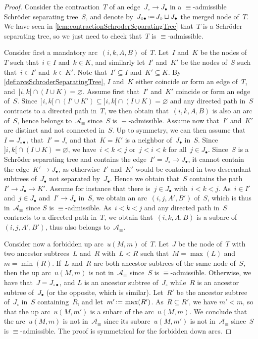 \documentclass{amsart}
\theoremstyle{definition}
\newcommand{\eqdef}{\mbox{\,\raisebox{0.2ex}{\scriptsize\ensuremath{\mathrm:}}\ensuremath{=}\,}} %
\newcommand{\arcs}{{\mathcal{A}}} %
\begin{document}
\begin{proof}
Consider the contraction~$T$ of an edge~$J_\circ \to J_\bullet$ in a $\equiv$-admissible Schröder separating tree~$S$, and denote by~$J_{\circ\bullet} \eqdef J_\circ \sqcup J_\bullet$ the merged node of~$T$.
We have seen in \cref{lem:contractionSchroderSeparatingTree} that~$T$ is a Schröder separating tree, so we just need to check that~$T$ is $\equiv$-admissible.

Consider first a mandatory arc~$(i,k,A,B)$ of~$T$.
Let~$I$ and~$K$ be the nodes of~$T$ such that~$i \in I$ and~$k \in K$, and similarly let~$I'$ and~$K'$ be the nodes of~$S$ such that~$i \in I'$ and~$k \in K'$.
Note that~$I' \subseteq I$ and~$K' \subseteq K$.
By \cref{def:arcsSchroderSeparatingTree}, $I$ and~$K$ either coincide or form an edge of~$T$, and~${{]i,k[} \cap (I \cup K) = \varnothing}$.
Assume first that~$I'$ and~$K'$ coincide or form an edge of~$S$.
Since~${{]i,k[} \cap (I' \cup K') \subseteq {]i,k[} \cap (I \cup K) = \varnothing}$ and any directed path in~$S$ contracts to a directed path in~$T$, we then obtain that~$(i,k,A,B)$ is also an arc of~$S$, hence belongs to~$\arcs_\equiv$ since~$S$ is $\equiv$-admissible.
Assume now that~$I'$ and~$K'$ are distinct and not connected in~$S$.
Up to symmetry, we can then assume that~$I = J_{\circ\bullet}$, that~$I' = J_\circ$ and that~$K = K'$ is a neighbor of~$J_\bullet$ in~$S$.
Since~${]i,k[} \cap (I \cup K) = \varnothing$, we have~$i < k < j$ or~$j < i < k$  for all~$j \in J_\bullet$.
Since~$S$ is a Schröder separating tree and contains the edge~$I' = J_\circ \to J_\bullet$, it cannot contain the edge~$K' \to J_\bullet$, as otherwise~$I'$ and~$K'$ would be contained in two descendant subtrees of~$J_\bullet$ not separated by~$J_\bullet$.
Hence we obtain that~$S$ contains the path~$I' \to J_\bullet \to K'$.
Assume for instance that there is~$j \in J_\bullet$ with~$i < k < j$.
As~$i \in I'$ and~$j \in J_\bullet$ and~$I' \to J_\bullet$ in~$S$, we obtain an arc~$(i, j, A', B')$ of~$S$, which is thus in~$\arcs_\equiv$ since $S$ is $\equiv$-admissible.
As~$i < k < j$ and any directed path in~$S$ contracts to a directed path in~$T$, we obtain that~$(i,k,A,B)$ is a subarc of~$(i,j,A',B')$, thus also belongs to~$\arcs_\equiv$.

Consider now a forbidden up arc~$u(M,m)$ of~$T$.
Let~$J$ be the node of~$T$ with two ancestor subtrees~$L$ and~$R$ with~$L < R$ such that~$M = \max(L)$ and~$m = \min(R)$.
If~$L$ and~$R$ are both ancestor subtrees of the same node of~$S$, then the up arc~$u(M,m)$ is not in~$\arcs_\equiv$ since~$S$ is \mbox{$\equiv$-admissible}.
Otherwise, we have that~$J = J_{\circ\bullet}$, and $L$ is an ancestor subtree of~$J_\circ$ while~$R$ is an ancestor subtree of~$J_\bullet$ (or the opposite, which is similar).
Let~$R'$ be the ancestor subtree of~$J_\circ$ in~$S$ containing~$R$, and let~$m' \eqdef \max(R')$.
As~${R \subseteq R'}$, we have $m' < m$, so that the up arc~$u(M, m')$ is a subarc of the arc~$u(M,m)$.
We conclude that the arc~$u(M,m)$ is not in~$\arcs_\equiv$ since its subarc~$u(M, m')$ is not in~$\arcs_\equiv$ since~$S$ is $\equiv$-admissible.
The proof is symmetrical for the forbidden down arcs.
\end{proof}
\end{document}

